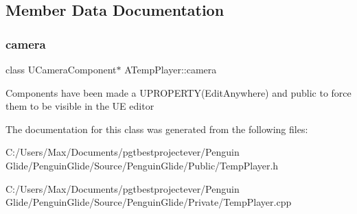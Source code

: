 \subsection{Member Data Documentation}
\mbox{\label{class_a_temp_player_a087ae8167b171f1f62c892cc1fcccaf0}} 
\subsubsection{\texorpdfstring{camera}{camera}}
{\footnotesize\ttfamily class U\+Camera\+Component$\ast$ A\+Temp\+Player\+::camera}

Components have been made a U\+P\+R\+O\+P\+E\+R\+T\+Y(\+Edit\+Anywhere) and public to force them to be visible in the UE editor 

The documentation for this class was generated from the following files\+:\begin{DoxyCompactItemize}
\item 
C\+:/\+Users/\+Max/\+Documents/pgtbestprojectever/\+Penguin Glide/\+Penguin\+Glide/\+Source/\+Penguin\+Glide/\+Public/Temp\+Player.\+h\item 
C\+:/\+Users/\+Max/\+Documents/pgtbestprojectever/\+Penguin Glide/\+Penguin\+Glide/\+Source/\+Penguin\+Glide/\+Private/Temp\+Player.\+cpp\end{DoxyCompactItemize}
